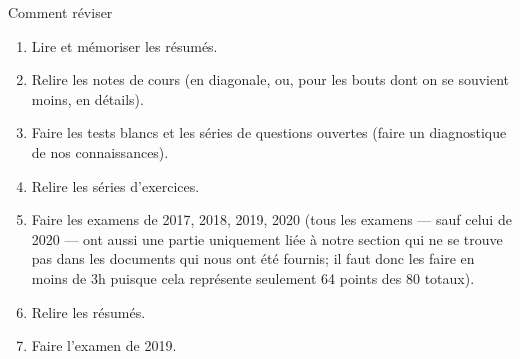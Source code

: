 \documentclass[a4paper]{article}
\begin{document}
\begin{parag}{Comment réviser}
    \begin{enumerate}[left=0pt]
        \item Lire et mémoriser les résumés.
        \item Relire les notes de cours (en diagonale, ou, pour les bouts dont on se souvient moins, en détails).
        \item Faire les tests blancs et les séries de questions ouvertes (faire un diagnostique de nos connaissances).
        \item Relire les séries d'exercices.
        \item Faire les examens de 2017, 2018, 2019, 2020 (tous les examens --- sauf celui de 2020 --- ont aussi une partie uniquement liée à notre section qui ne se trouve pas dans les documents qui nous ont été fournis; il faut donc les faire en moins de 3h puisque cela représente seulement 64 points des 80 totaux).
        \item Relire les résumés.
        \item Faire l'examen de 2019.
    \end{enumerate}

    \vspace{1em}

\end{parag}
\end{document}
